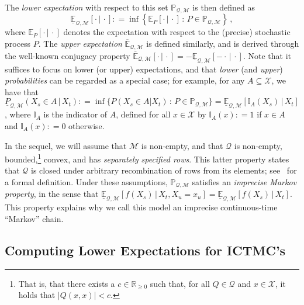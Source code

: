 \documentclass[twoside,11pt]{article}
\newcommand{\reals}{\mathbb{R}}
\newcommand{\realsnonneg}{\reals_{\geq 0}}
\newcommand{\states}{\mathcal{X}}
\newcommand{\lexp}{\underline{\mathbb{E}}_{\rateset,\mathcal{M}}}
\newcommand{\uexp}{\overline{\mathbb{E}}_{\rateset,\mathcal{M}}}
\newcommand{\ind}[1]{\mathbb{I}_{#1}}
\newcommand{\rateset}{\mathcal{Q}}
\newcommand{\abs}[1]{\left\vert #1 \right\vert}
\newcommand{\coloneqq}{:\!=}
\begin{document}
The \emph{lower expectation} with respect to this set $\mathbb{P}_{\rateset,\mathcal{M}}$ is then defined as
\begin{equation*}
\underline{\mathbb{E}}_{\rateset,\mathcal{M}}[\cdot\,\vert\,\cdot] \coloneqq \inf\left\{ \mathbb{E}_P[\cdot\,\vert\,\cdot]\,:\, P\in\mathbb{P}_{\rateset,\mathcal{M}} \right\}\,,
\end{equation*}
where $\mathbb{E}_P[\cdot\,\vert\,\cdot]$ denotes the expectation with respect to the (precise) stochastic process $P$. The \emph{upper expectation} $\uexp$ is defined similarly, and is derived through the well-known conjugacy property $\uexp[\cdot\,\vert\,\cdot] = -\lexp[-\cdot\,\vert\,\cdot]$. Note that it suffices to focus on lower (or upper) expectations, and that \emph{lower} (and \emph{upper}) \emph{probabilities} can be regarded as a special case; for example, for any $A\subseteq\states$, we have that $\underline{P}_{\rateset,\mathcal{M}}(X_s\in A\,\vert\,X_t) \coloneqq \inf\{P(X_s\in A\vert X_t)\,:\,P\in\mathbb{P}_{\rateset,\mathcal{M}}\}=\lexp[\ind{A}(X_s)\,\vert\,X_t]$, where $\ind{A}$ is the indicator of $A$, defined for all $x\in\states$ by $\ind{A}(x)\coloneqq1$ if $x\in A$ and $\ind{A}(x)\coloneqq0$ otherwise.

In the sequel, we will assume that $\mathcal{M}$ is non-empty, and that $\rateset$ is non-empty, bounded,\footnote{That is, that there exists a $c\in\realsnonneg$ such that, for all $Q\in\rateset$ and $x\in\states$, it holds that $\abs{Q(x,x)}<c$.} convex, and has \emph{separately specified rows}. This latter property states that $\rateset$ is closed under arbitrary recombination of rows from its elements; see~\citep[Definition 24]{krak2016ictmc} for a formal definition. %
Under these assumptions, $\mathbb{P}_{\rateset,\mathcal{M}}$ satisfies an \emph{imprecise Markov property}, in the sense that $\lexp[f(X_s)\,\vert\,X_t,X_u=x_u]=\lexp[f(X_s)\,\vert\,X_t]$. This property explains why we call this model an imprecise continuous-time ``Markov'' chain.

\subsection{Computing Lower Expectations for ICTMC's}\label{subsec:ICTMC_computations}
\end{document}

